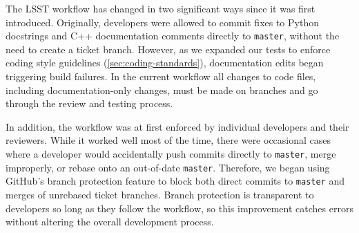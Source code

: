 The LSST workflow has changed in two significant ways since it was first introduced.
Originally, developers were allowed to commit fixes to Python docstrings and C++ documentation comments directly to \texttt{master}, without the need to create a ticket branch.
However, as we expanded our tests to enforce coding style guidelines (\autoref{sec:coding-standards}), documentation edits began triggering build failures.
In the current workflow all changes to code files, including documentation-only changes, must be made on branches and go through the review and testing process.

In addition, the workflow was at first enforced by individual developers and their reviewers.
While it worked well most of the time, there were occasional cases where a developer would accidentally push commits directly to \texttt{master}, merge improperly, or rebase onto an out-of-date \texttt{master}.
Therefore, we began using GitHub's branch protection feature to block both direct commits to \texttt{master} and merges of unrebased ticket branches.
Branch protection is transparent to developers so long as they follow the workflow, so this improvement catches errors without altering the overall development process.


